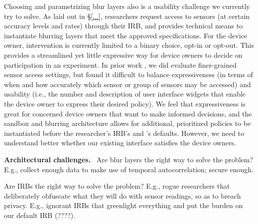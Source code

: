 Choosing and parametrizing blur layers also is a usability 
challenge we currently try to solve. As laid out in \S\ref{...}, 
researchers request access to sensors (at certain accuracy levels 
and rates) through their IRB, and \sysname provides technical means 
to instantiate blurring layers that meet the approved specifications. 
For the device owner, intervention is currently limited to a binary 
choice, opt-in or opt-out. This provides a streamlined yet little 
expressive way for device owners to decide on participation in an 
experiment. In prior work \cite{sensorium}, we did evaluate 
finer-grained sensor access settings, but found it difficult to 
balance expressiveness (in terms of when and how accurately which 
sensor or group of sensors may be accessed) and usability (i.e., 
the number and description of user interface widgets that enable 
the device owner to express their desired policy).
We feel that expressiveness is great for concerned device owners 
that want to make informed decisions, and the sandbox and blurring 
architecture allows for additional, prioritized policies to be 
instantiated before the researcher's IRB's and \sysname's defaults. 
However, we need to understand better whether our existing interface 
satisfies the device owners.

\textbf{Architectural challenges.}~
Are blur layers the right way to solve the problem? E.g., 
collect enough data to make use of temporal autocorrelation; secure enough.

Are IRBs the right way to solve the problem? E.g., 
rogue researchers that deliberately obfuscate what they will 
do with sensor readings, so as to breach privacy. E.g., 
ignorant IRBs that greenlight everything and put the burden on 
our default IRB (????).

